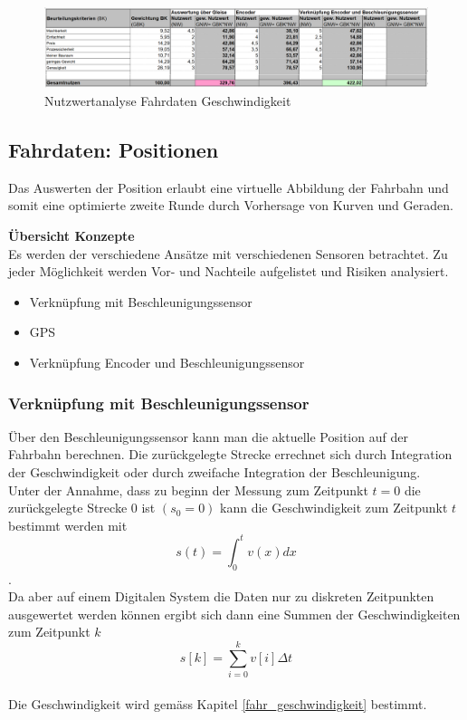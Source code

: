 \documentclass[../../main.tex]{subfiles}
\begin{document}
    \begin{figure}[H]
        \centering
        \includegraphics[width=1.0\textwidth]{Nutzweranalyse_Fahrdaten_Geschwindigkeit.png}
        \caption {Nutzwertanalyse Fahrdaten Geschwindigkeit}
        \label{fig:fahr_nutzwertanalyse_geschwindigkeit}
    \end{figure}

    \subsection{Fahrdaten: Positionen}
    Das Auswerten der Position erlaubt eine virtuelle Abbildung der Fahrbahn und somit eine optimierte zweite Runde durch Vorhersage von Kurven und Geraden.


    \textbf{Übersicht Konzepte}\\
    Es werden der verschiedene Ansätze mit verschiedenen Sensoren betrachtet. Zu jeder Möglichkeit werden Vor- und Nachteile aufgelistet und Risiken analysiert.
    \begin{itemize}
        \item Verknüpfung mit Beschleunigungssensor
        \item GPS
        \item Verknüpfung Encoder und Beschleunigungssensor
    \end{itemize}

    \subsubsection{Verknüpfung mit Beschleunigungssensor}
    Über den Beschleunigungssensor kann man die aktuelle Position auf der Fahrbahn berechnen. Die zurückgelegte Strecke errechnet sich durch Integration der Geschwindigkeit oder durch zweifache Integration der Beschleunigung.\\
    Unter der Annahme, dass zu beginn der Messung zum Zeitpunkt $t = 0$ die zurückgelegte Strecke $0$ ist $(s_0 = 0)$ kann die Geschwindigkeit zum Zeitpunkt $t$ bestimmt werden mit $$s(t) = \int_{0}^{t} v(x) dx$$.\\
    Da aber auf einem Digitalen System die Daten nur zu diskreten Zeitpunkten ausgewertet werden können ergibt sich dann eine Summen der Geschwindigkeiten zum Zeitpunkt $k$ $$s[k] = \sum_{i=0}^{k}v[i] \Delta t$$\\
    Die Geschwindigkeit wird gemäss Kapitel \ref{fahr_geschwindigkeit} bestimmt.
\end{document}
